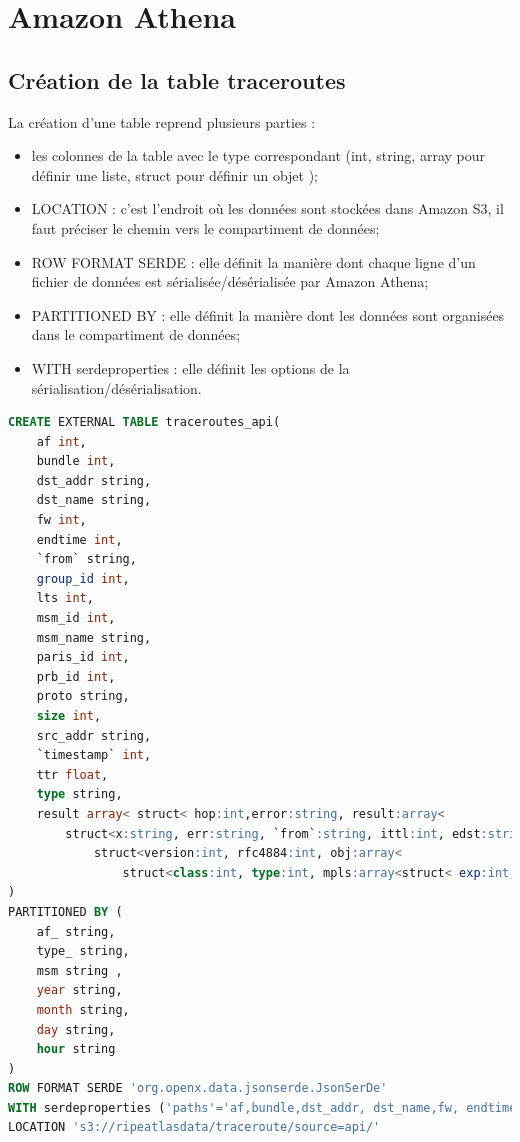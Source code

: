 \appendix

\chapter{Amazon Athena } \label{athena-appendix}

\section{Création de la table traceroutes } \label{creer-table-traceroute}
La création d'une table reprend plusieurs parties :
\begin{itemize}
	\item les colonnes de la table avec le type correspondant (int, string, array pour définir une liste, struct pour définir un objet );
	\item LOCATION : c'est l'endroit où les données sont stockées dans Amazon S3, il faut préciser le chemin vers le compartiment de données;
	\item ROW FORMAT SERDE : elle définit la manière dont chaque ligne d'un fichier de données est sérialisée/désérialisée par Amazon Athena;
	\item PARTITIONED BY : elle définit la manière dont les données sont organisées dans le compartiment de données; 
	\item WITH serdeproperties : elle définit les options de la sérialisation/désérialisation.
\end{itemize}
\begin{lstlisting}[language=SQL, basicstyle=\footnotesize, label=createAthenaTable, caption={Création de la table des traceroutes dans Amazon Athena }]
CREATE EXTERNAL TABLE traceroutes_api(
	af int,
	bundle int,
	dst_addr string,
	dst_name string,
	fw int,
	endtime int,
	`from` string,
	group_id int,
	lts int,
	msm_id int,
	msm_name string,
	paris_id int,
	prb_id int,
	proto string,
	size int,
	src_addr string,
	`timestamp` int,
	ttr float,
	type string,
    result array< struct< hop:int,error:string, result:array<
        struct<x:string, err:string, `from`:string, ittl:int, edst:string, late:int, mtu:int, rtt:float, size:int, ttl:int , flags:string, dstoptsize:int, hbhoptsize:int, icmpext:
        	struct<version:int, rfc4884:int, obj:array< 
        		struct<class:int, type:int, mpls:array<struct< exp:int, label:int, s:int, ttl:int>>>>>>>>> 
)
PARTITIONED BY (
	af_ string,
	type_ string,
	msm string ,
	year string,
	month string,
	day string,
	hour string
) 
ROW FORMAT SERDE 'org.openx.data.jsonserde.JsonSerDe'
WITH serdeproperties ('paths'='af,bundle,dst_addr, dst_name,fw, endtime, from, lts, msm_id, paris_id, prb_id, proto, size, src_addr, timestamp, type,fw, msm_name' ) 
LOCATION 's3://ripeatlasdata/traceroute/source=api/'
\end{lstlisting}

